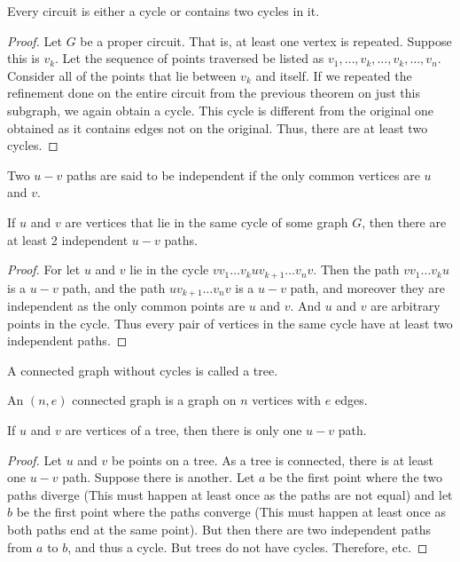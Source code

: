 \documentclass[crop=false,class=book,oneside]{standalone}
\begin{document}
        \begin{theorem}
        Every circuit is either a cycle or contains two cycles in it.
        \end{theorem}
        \begin{proof}
        Let $G$ be a proper circuit. That is, at least one vertex is repeated. Suppose this is $v_k$. Let the sequence of points traversed be listed as $v_1,\hdots, v_k, \hdots,v_k, \hdots, v_n$. Consider all of the points that lie between $v_k$ and itself. If we repeated the refinement done on the entire circuit from the previous theorem on just this subgraph, we again obtain a cycle. This cycle is different from the original one obtained as it contains edges not on the original. Thus, there are at least two cycles.
        \end{proof}
        \begin{definition}
        Two $u-v$ paths are said to be independent if the only common vertices are $u$ and $v$.
        \end{definition}
        \begin{theorem}
        If $u$ and $v$ are vertices that lie in the same cycle of some graph $G$, then there are at least 2 independent $u-v$ paths.
        \end{theorem}
        \begin{proof}
        For let $u$ and $v$ lie in the cycle $vv_1 \hdots v_k u v_{k+1}\hdots v_n v$. Then the path $v v_1 \hdots v_k u$ is a $u-v$ path, and the path $u v_{k+1} \hdots v_n v$ is a $u-v$ path, and moreover they are independent as the only common points are $u$ and $v$. And $u$ and $v$ are arbitrary points in the cycle. Thus every pair of vertices in the same cycle have at least two independent paths.
        \end{proof}
        \begin{definition}
        A connected graph without cycles is called a tree.
        \end{definition}
        \begin{definition}
        An $(n,e)$ connected graph is a graph on $n$ vertices with $e$ edges.
        \end{definition}
        \begin{theorem}
        If $u$ and $v$ are vertices of a tree, then there is only one $u-v$ path.
        \end{theorem}
        \begin{proof}
        Let $u$ and $v$ be points on a tree. As a tree is connected, there is at least one $u-v$ path. Suppose there is another. Let $a$ be the first point where the two paths diverge (This must happen at least once as the paths are not equal) and let $b$ be the first point where the paths converge (This must happen at least once as both paths end at the same point). But then there are two independent paths from $a$ to $b$, and thus a cycle. But trees do not have cycles. Therefore, etc.
        \end{proof}
\end{document}
